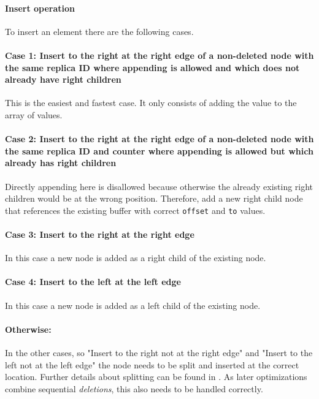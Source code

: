 \clearpage

\paragraph{Insert operation}

To insert an element there are the following cases.

\paragraph{Case 1: Insert to the right at the right edge of a non-deleted node with the same replica ID where appending is allowed and which does not already have right children}

This is the easiest and fastest case. It only consists of adding the value to the array of values.

\paragraph{Case 2: Insert to the right at the right edge of a non-deleted node with the same replica ID and counter where appending is allowed but which already has right children}

Directly appending here is disallowed because otherwise the already existing right children would be at the wrong position. Therefore, add a new right child node that references the existing buffer with correct \texttt{offset} and \texttt{to} values.

\paragraph{Case 3: Insert to the right at the right edge}

In this case a new node is added as a right child of the existing node.

\paragraph{Case 4: Insert to the left at the left edge}

In this case a new node is added as a left child of the existing node.

\paragraph{Otherwise:}

In the other cases, so "Insert to the right not at the right edge" and "Insert to the left not at the left edge" the node needs to be split and inserted at the correct location. Further details about splitting can be found in . As later optimizations combine sequential \textit{deletions}, this also needs to be handled correctly.

